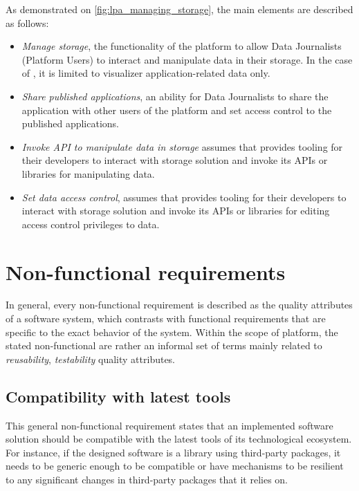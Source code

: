 As demonstrated on \autoref{fig:lpa_managing_storage}, the main elements are described as follows:
\begin{itemize}
    \item \textit{Manage storage}, the functionality of the platform to allow Data Journalists (Platform Users) to interact and manipulate data in their storage. In the case of \lpa{}, it is limited to visualizer application-related data only. 
    \item \textit{Share published applications}, an ability for Data Journalists to share the application with other users of the \lpa{} platform and set access control to the published applications.
    \item \textit{Invoke API to manipulate data in storage} assumes that \lpa{} provides tooling for their developers to interact with storage solution and invoke its APIs or libraries for manipulating data.
    \item \textit{Set data access control}, assumes that \lpa{} provides tooling for their developers to interact with storage solution and invoke its APIs or libraries for editing access control privileges to data.
\end{itemize}

\section{Non-functional requirements}
\label{ssec:non_functional_requirements}

In general, every non-functional requirement is described as the quality attributes of a software system, which contrasts with functional requirements that are specific to the exact behavior of the system. Within the scope of \lpa{} platform, the stated non-functional are rather an informal set of terms mainly related to \textit{reusability}, \textit{testability} quality attributes. 

\subsection{Compatibility with latest tools}

This general non-functional requirement states that an implemented software solution should be compatible with the latest tools of its technological ecosystem. For instance, if the designed software is a library using third-party packages, it needs to be generic enough to be compatible or have mechanisms to be resilient to any significant changes in third-party packages that it relies on.

